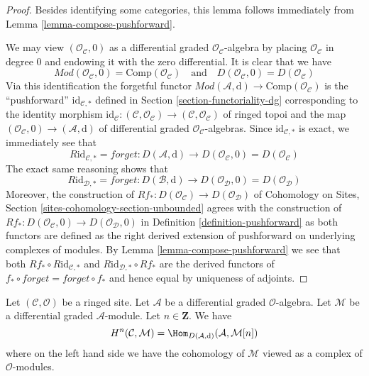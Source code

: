 \begin{proof}
Besides identifying some categories, this lemma follows immediately
from Lemma \ref{lemma-compose-pushforward}.

\medskip\noindent
We may view $(\mathcal{O}_\mathcal{C}, 0)$ as a differential graded
$\mathcal{O}_\mathcal{C}$-algebra by placing $\mathcal{O}_\mathcal{C}$
in degree $0$ and endowing it with the zero differential. It is clear
that we have
$$
\textit{Mod}(\mathcal{O}_\mathcal{C}, 0) =
\text{Comp}(\mathcal{O}_\mathcal{C})
\quad\text{and}\quad
D(\mathcal{O}_\mathcal{C}, 0) = D(\mathcal{O}_\mathcal{C})
$$
Via this identification the forgetful functor
$\textit{Mod}(\mathcal{A}, \text{d}) \to
\text{Comp}(\mathcal{O}_\mathcal{C})$
is the ``pushforward'' $\text{id}_{\mathcal{C}, *}$
defined in Section \ref{section-functoriality-dg}
corresponding to the identity morphism
$\text{id}_\mathcal{C} : (\mathcal{C}, \mathcal{O}_\mathcal{C}) \to
(\mathcal{C}, \mathcal{O}_\mathcal{C})$ of ringed topoi and the
map $(\mathcal{O}_\mathcal{C}, 0) \to (\mathcal{A}, \text{d})$
of differential graded $\mathcal{O}_\mathcal{C}$-algebras.
Since $\text{id}_{\mathcal{C}, *}$ is exact, we immediately see that
$$
R\text{id}_{\mathcal{C}, *} = forget :
D(\mathcal{A}, \text{d}) \longrightarrow
D(\mathcal{O}_\mathcal{C}, 0) = D(\mathcal{O}_\mathcal{C})
$$
The exact same reasoning shows that
$$
R\text{id}_{\mathcal{D}, *} = forget :
D(\mathcal{B}, \text{d}) \longrightarrow
D(\mathcal{O}_\mathcal{D}, 0) = D(\mathcal{O}_\mathcal{D})
$$
Moreover, the construction of
$Rf_* : D(\mathcal{O}_\mathcal{C}) \to D(\mathcal{O}_\mathcal{D})$
of Cohomology on Sites, Section \ref{sites-cohomology-section-unbounded}
agrees with the construction of
$Rf_* : D(\mathcal{O}_\mathcal{C}, 0) \to D(\mathcal{O}_\mathcal{D}, 0)$
in Definition \ref{definition-pushforward}
as both functors are defined as the right derived extension of
pushforward on underlying complexes of modules.
By Lemma \ref{lemma-compose-pushforward} we see that both
$Rf_* \circ R\text{id}_{\mathcal{C}, *}$ and
$R\text{id}_{\mathcal{D}, *} \circ Rf_*$ are the derived functors
of $f_* \circ forget = forget \circ f_*$ and hence equal
by uniqueness of adjoints.
\end{proof}

\begin{lemma}
\label{lemma-cohomology-ext}
Let $(\mathcal{C}, \mathcal{O})$ be a ringed site.
Let $\mathcal{A}$ be a differential graded $\mathcal{O}$-algebra.
Let $\mathcal{M}$ be a differential graded $\mathcal{A}$-module.
Let $n \in \mathbf{Z}$. We have
$$
H^n(\mathcal{C}, \mathcal{M}) =
\Hom_{D(\mathcal{A}, \text{d})}(\mathcal{A}, \mathcal{M}[n])
$$
where on the left hand side we have the cohomology of $\mathcal{M}$
viewed as a complex of $\mathcal{O}$-modules.
\end{lemma}

